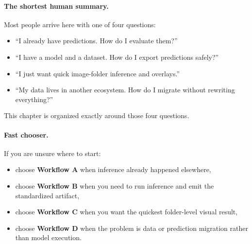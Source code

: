 \paragraph{The shortest human summary.}
Most people arrive here with one of four questions:
\begin{itemize}
  \item ``I already have predictions. How do I evaluate them?''
  \item ``I have a model and a dataset. How do I export predictions safely?''
  \item ``I just want quick image-folder inference and overlays.''
  \item ``My data lives in another ecosystem. How do I migrate without rewriting everything?''
\end{itemize}

This chapter is organized exactly around those four questions.

\paragraph{Fast chooser.}
If you are unsure where to start:
\begin{itemize}
  \item choose \textbf{Workflow A} when inference already happened elsewhere,
  \item choose \textbf{Workflow B} when you need \yolozu{} to run inference and emit the standardized artifact,
  \item choose \textbf{Workflow C} when you want the quickest folder-level visual result,
  \item choose \textbf{Workflow D} when the problem is data or prediction migration rather than model execution.
\end{itemize}

